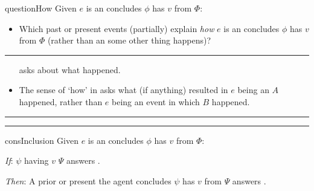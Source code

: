 \documentclass[10pt]{article}
\newcommand{\squareBullet}{\textcolor{black}{\raisebox{.45ex}{\rule{.6ex}{.6ex}}}}
\newcommand\lLine{{\color{lightgray} \noindent\rule{\textwidth}{0.4pt}}}
\newcommand\sepLine{
  \vfill
  \par\noindent\rule{\textwidth}{0.4pt}%
  \vspace{-10pt}%
  \par\noindent\rule{\textwidth}{0.4pt}
  \vfill}
\newcommand{\hand}{\ding{43}}
\begin{document}
\begin{note}
  \begin{question}{questionHow}{\qHow{}}
    Given \(e\) is an  \vAgent{} concludes \prop{} \(\phi\) has \val{} \(v\) from \pool{} \(\Phi\):
    \begin{itemize}[label = \squareBullet]
    \item
      Which past or present events (partially) explain \emph{how} \(e\) is an  \vAgent{} concludes \prop{} \(\phi\) has \val{} \(v\) from \pool{} \(\Phi\) (rather than an  some other thing happens)?
    \end{itemize}
    \vspace{-1.5\baselineskip}
  \end{question}
\end{note}

\lLine

\begin{note}
  \begin{itemize}
  \item[\hand]
    \qHow{} asks about what happened.
  \end{itemize}

  \begin{itemize}[noitemsep]
  \item
    The sense of `how' in \qHow{} asks what (if anything) resulted in \(e\) being an \eiw{} \(A\) happened, rather than \(e\) being an event in which \(B\) happened.
  \end{itemize}
\end{note}

\sepLine

\begin{note}
  \begin{constraint}{consInclusion}{\issueInclusion{}}
    Given \(e\) is an  \vAgent{} concludes \prop{} \(\phi\) has \val{} \(v\) from \pool{} \(\Phi\):
    \begin{itenum}
    \item[\emph{If}:]
       \(\psi\) having \val{} \(v\) \fingf{} \pool{} \(\Psi\) answers \qWhy{}.
    \item[\emph{Then}:]
      A prior or present  the agent concludes \(\psi\) has \val{} \(v\) from \pool{} \(\Psi\) answers \qHow{}.
    \end{itenum}
    \vspace{-1.25\baselineskip}
  \end{constraint}
\end{note}
\end{document}
